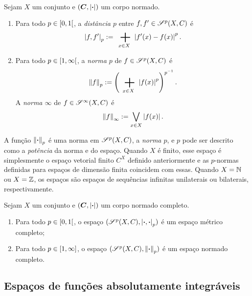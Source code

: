 \begin{definition}
Sejam $X$ um conjunto e $(\bm C, \left\vert{\bm{\cdot}}\right\vert)$ um corpo normado.
	\begin{enumerate}
	\item Para todo $p \in \left[{0},{1}\right[$, a \emph{distância $p$} entre $f,f' \in \mathscr{S}^p(X,C)$ é
	\begin{equation*}
	\dist{f}{f'}_p :=  \sum_{x \in X} \abs{f'(x) - f(x)}^p.
	\end{equation*}

	\item Para todo $p \in \left[{1},{\infty}\right[$, a \emph{norma $p$} de $f \in \mathscr{S}^p(X,C)$ é
	\begin{equation*}
	\nor{f}_p := \left( \sum_{x \in X} \abs{f(x)}^p \right)^{p\inv}.
	\end{equation*}
A \emph{norma $\infty$} de $f \in \mathscr{S}^\infty(X,C)$ é
	\begin{equation*}
	\left\Vert{f}\right\Vert_\infty := \bigvee_{x \in X} \left\vert{f(x)}\right\vert.
	\end{equation*}
	\end{enumerate}
\end{definition}

A função $\left\Vert{\bm{\cdot}}\right\Vert_p$ é uma norma em $\mathscr{S}^p(X,C)$, a \emph{norma $p$}, e $p$ pode ser descrito como a \emph{potência} da norma e do espaço. Quando $X$ é finito, esse espaço é simplesmente o espaço vetorial finito $C^X$ definido anteriormente e as $p$-normas definidas para espaços de dimensão finita coincidem com essas. Quando $X=\mathbb{N}$ ou $X=\mathbb{Z}$, os espaços são espaços de sequências infinitas unilaterais ou bilaterais, respectivamente.

\begin{proposition}
Sejam $X$ um conjunto e $(\bm C, \left\vert{\bm{\cdot}}\right\vert)$ um corpo normado completo.
	\begin{enumerate}
	\item Para todo $p \in \left[{0},{1}\right[$, o espaço $(\mathscr{S}^p(X,C),\left\vert{\bm{\cdot}},{\bm{\cdot}}\right\vert_p)$ é um espaço métrico completo;

	\item Para todo $p \in \left[{1},{\infty}\right]$, o espaço $(\mathscr{S}^p(X,C),\left\Vert{\bm{\cdot}}\right\Vert_p)$ é um espaço normado completo.
	\end{enumerate}
\end{proposition}


\subsection{Espaços de funções absolutamente integráveis}

